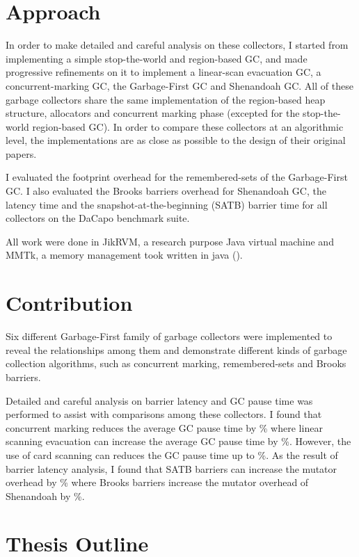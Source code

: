 \section{Approach}

In order to make detailed and careful analysis on these collectors, I started
from implementing a simple stop-the-world and region-based GC, and made
progressive refinements on it to implement a linear-scan evacuation GC,
a concurrent-marking GC, the Garbage-First GC and Shenandoah GC.
All of these garbage collectors share the same implementation of the region-based
heap structure, allocators and concurrent marking phase
(excepted for the stop-the-world region-based GC).
In order to compare these collectors at an algorithmic level, the implementations
are as close as possible to the design of their original papers.

I evaluated the footprint overhead for the remembered-sets of the Garbage-First
GC. I also evaluated the Brooks barriers overhead for Shenandoah GC, the latency
time and the snapshot-at-the-beginning (SATB) barrier time for all collectors
on the DaCapo benchmark suite.

All work were done in JikRVM, a research purpose Java virtual machine and MMTk,
a memory management took written in java (\cite{blackburn2004oil}).

\section{Contribution}

Six different Garbage-First family of garbage collectors were implemented to reveal
the relationships among them and demonstrate different kinds of garbage collection
algorithms, such as concurrent marking, remembered-sets and Brooks barriers.

Detailed and careful analysis on barrier latency and GC pause time was performed to
assist with comparisons among these collectors.
I found that concurrent marking reduces the average GC pause time by \%
where linear scanning evacuation can increase the average GC pause time by \%.
However, the use of card scanning can reduces the GC pause time up to \%.
As the result of barrier latency analysis, I found that SATB barriers can
increase the mutator overhead by \% where Brooks barriers
increase the mutator overhead of Shenandoah by \%.

\section{Thesis Outline}

